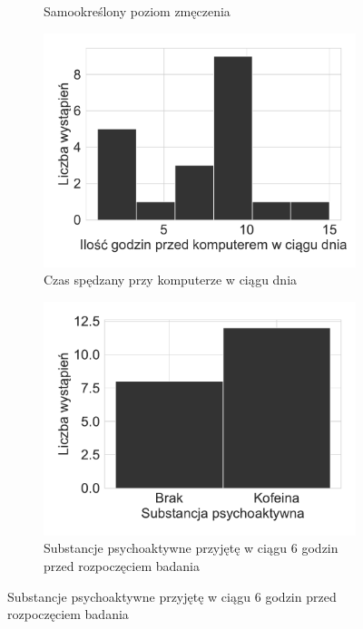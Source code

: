 \documentclass{./assets/wfis}
\begin{document}
\begin{figure}[h!]
\begin{subfigure}[b]{0.45\textwidth}
    \caption{Samookreślony poziom zmęczenia}
    \label{fig:tired}
\end{subfigure}
\begin{subfigure}[b]{0.45\textwidth}
    \centering
    \includegraphics[width=\columnwidth]{thesis/plots/computer_hours.pdf}
    \caption{Czas spędzany przy komputerze w ciągu dnia}
    \label{fig:computer-time}
\end{subfigure}   
\hfill
\begin{subfigure}[b]{0.45\textwidth}
    \centering
    \includegraphics[width=\columnwidth]{thesis/plots/psychoactive_substances.pdf}
    \caption{Substancje psychoaktywne przyjętę w ciągu 6 godzin przed rozpoczęciem badania}
    \label{fig:psychoactive-substances}

\end{subfigure}
\end{figure}
\end{document}
